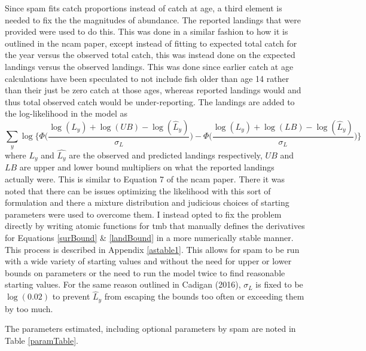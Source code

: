 \documentclass[11pt]{article}\usepackage[]{graphicx}\usepackage[]{color}
\begin{document}
Since \acrshort{spam} fits catch proportions instead of catch at age, a third element is needed to fix the the magnitudes of abundance. The reported landings that were provided were used to do this. This was done in a similar fashion to how it is outlined in the \acrshort{ncam} paper, except instead of fitting to expected total catch for the year versus the observed total catch, this was instead done on the expected landings versus the observed landings. This was done since earlier catch at age calculations have been speculated to not include fish older than age 14 rather than their just be zero catch at those ages, whereas reported landings would and thus total observed catch would be under-reporting. The landings are added to the log-likelihood in the model as
\begin{equation}\label{landBound}
\sum_y \log\bigg\{\Phi\bigg(\frac{\log(L_y) + \log(UB)	- \log(\hat{L}_y)}{\sigma_L}\bigg)-\Phi\bigg(\frac{\log(L_y) + \log(LB)	- \log(\hat{L}_y)}{\sigma_L}\bigg)\bigg\}
\end{equation}
where $L_y$ and $\hat{L_y}$ are the observed and predicted landings respectively, $UB$ and $LB$ are upper and lower bound multipliers on what the reported landings actually were. This is similar to Equation 7 of the \acrshort{ncam} paper. There it was noted that there can be issues optimizing the likelihood with this sort of formulation and there a mixture distribution and judicious choices of starting parameters were used to overcome them\cite{Cadigan2016A-state-space-s}. I instead opted to fix the problem directly by writing atomic functions for \acrshort{tmb} that manually defines the derivatives for Equations \ref{surBound} \& \ref{landBound} in a more numerically stable manner. This process is described in Appendix \ref{astable1}. This allows for \acrshort{spam} to be run with a wide variety of starting values and without the need for upper or lower bounds on parameters or the need to run the model twice to find reasonable starting values. For the same reason outlined in Cadigan (2016)\cite{Cadigan2016A-state-space-s}, $\sigma_L$ is fixed to be $\log(0.02)$ to prevent $\hat{L}_y$ from escaping the bounds too often or exceeding them by too much. 


The parameters estimated, including optional parameters by \acrshort{spam} are noted in Table \ref{paramTable}.
\end{document}

